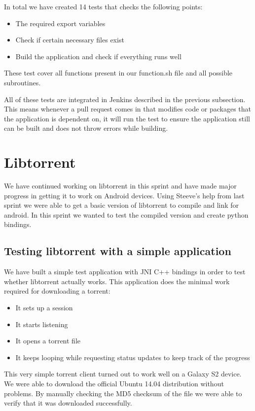 		In total we have created 14 tests that checks the following points:
		
		\begin{itemize}
			\item The required export variables
			\item Check if certain necessary files exist
			\item Build the application and check if everything runs well
		\end{itemize}
		
		These test cover all functions present in our function.sh file and all possible subroutines. 
		
		All of these tests are integrated in Jenkins described in the previous subsection. This means whenever a pull request comes in that modifies code or packages that the application is dependent on, it will run the test to ensure the application still can be built and does not throw errors while building.
	
	\section{Libtorrent}
		We have continued working on libtorrent in this sprint and have made major progress in getting it to work on Android devices. Using Steeve's help from last sprint we were able to get a basic version of libtorrent to compile and link for android. In this sprint we wanted to test the compiled version and create python bindings.
		
		\subsection{Testing libtorrent with a simple application}
			We have built a simple test application with JNI C++ bindings in order to test whether libtorrent actually works. This application does the minimal work required for downloading a torrent:
			\begin{itemize}
				\item It sets up a session
				\item It starts listening
				\item It opens a torrent file
				\item It keeps looping while requesting status updates to keep track of the progress
			\end{itemize}
			This very simple torrent client turned out to work well on a Galaxy S2 device. We were able to download the official Ubuntu 14.04 distribution without problems. By manually checking the MD5 checksum of the file we were able to verify that it was downloaded successfully.
		

